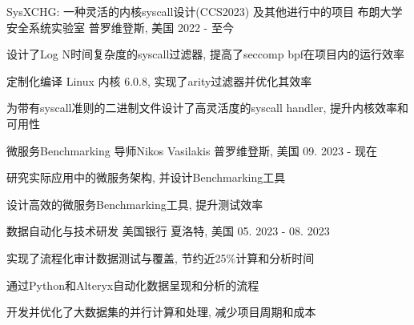 \begin{cventries}
 
  \cventry
    {SysXCHG: 一种灵活的内核syscall设计(CCS2023) 及其他进行中的项目}
    {布朗大学安全系统实验室}
    {普罗维登斯, 美国}
    {2022 - 至今}
    {
      \begin{cvitems}
        \item {设计了Log N时间复杂度的syscall过滤器, 提高了seccomp bpf在项目内的运行效率}
        \item {定制化编译 Linux 内核 6.0.8, 实现了arity过滤器并优化其效率}
        \item {为带有syscall准则的二进制文件设计了高灵活度的syscall handler, 提升内核效率和可用性}      
      \end{cvitems}
    }

\begin{comment}
  \cventry
    {Interp-flow Hijacking: eBPF在内核中的控制流劫持}
    {导师: 申文博}
    {远程}
    {09. 2023 - 现在}
    {
      \begin{cvitems}
        \item {}
        \item {}
      \end{cvitems}
    }
  \end{comment}

  \cventry
    {微服务Benchmarking}
    {导师Nikos Vasilakis}
    {普罗维登斯, 美国}
    {09. 2023 - 现在}
    {
      \begin{cvitems}
        \item {研究实际应用中的微服务架构, 并设计Benchmarking工具}
        \item {设计高效的微服务Benchmarking工具, 提升测试效率}
      \end{cvitems}
    }

  \cventry
    {数据自动化与技术研发}
    {美国银行}
    {夏洛特, 美国}
    {05. 2023 - 08. 2023}
    {
      \begin{cvitems}
        \item {实现了流程化审计数据测试与覆盖, 节约近25\%计算和分析时间}
        \item {通过Python和Alteryx自动化数据呈现和分析的流程}
        \item {开发并优化了大数据集的并行计算和处理, 减少项目周期和成本}
      \end{cvitems}
    }

  \begin{comment}
  \cventry
    {Machine Learning \& Computation}
    {Chemical Molecular Energy Optimization}
    {Providence, RI}
    {Aug 2022 - Present}
    {
      \begin{cvitems}
        \item {Analyzed traditional Hartree-Fock and DFT methods with Gaussian}
        \item {Implemented the original data pipeline on Brown's Oscar super computing cluster with 200x speed}
        \item {Working on an efficient Belief Propagation network based on HMC}
      \end{cvitems}
    }
  \end{comment}


\end{cventries}
